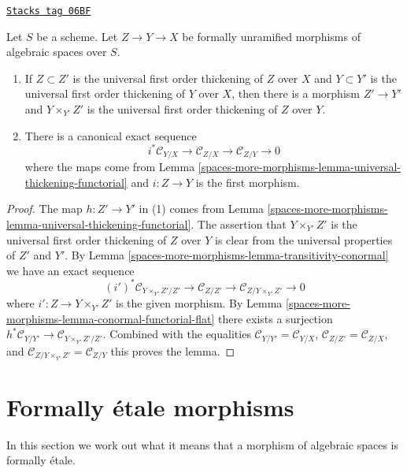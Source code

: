 \begin{lemma}
\label{spaces-more-morphisms-lemma-transitivity-conormal-unramified}
\href{https://stacks.math.columbia.edu/tag/06BF}{\texttt{Stacks tag 06BF}}

Let $S$ be a scheme.
Let $Z \to Y \to X$ be formally unramified morphisms of
algebraic spaces over $S$.
\begin{enumerate}
\item If $Z \subset Z'$ is the universal first order thickening of $Z$
over $X$ and $Y \subset Y'$ is the universal first order thickening of $Y$
over $X$, then there is a morphism $Z' \to Y'$ and $Y \times_{Y'} Z'$ is
the universal first order thickening of $Z$ over $Y$.
\item There is a canonical exact sequence
$$
i^*\mathcal{C}_{Y/X} \to
\mathcal{C}_{Z/X} \to
\mathcal{C}_{Z/Y} \to 0
$$
where the maps come from
Lemma \ref{spaces-more-morphisms-lemma-universal-thickening-functorial}
and $i : Z \to Y$ is the first morphism.
\end{enumerate}
\end{lemma}

\begin{proof}
The map $h : Z' \to Y'$ in (1) comes from
Lemma \ref{spaces-more-morphisms-lemma-universal-thickening-functorial}.
The assertion that $Y \times_{Y'} Z'$ is the universal first order
thickening of $Z$ over $Y$ is clear from the universal properties
of $Z'$ and $Y'$. By
Lemma \ref{spaces-more-morphisms-lemma-transitivity-conormal}
we have an exact sequence
$$
(i')^*\mathcal{C}_{Y \times_{Y'} Z'/Z'} \to
\mathcal{C}_{Z/Z'} \to
\mathcal{C}_{Z/Y \times_{Y'} Z'} \to 0
$$
where $i' : Z \to Y \times_{Y'} Z'$ is the given morphism. By
Lemma \ref{spaces-more-morphisms-lemma-conormal-functorial-flat}
there exists a surjection
$h^*\mathcal{C}_{Y/Y'} \to \mathcal{C}_{Y \times_{Y'} Z'/Z'}$.
Combined with the equalities
$\mathcal{C}_{Y/Y'} = \mathcal{C}_{Y/X}$,
$\mathcal{C}_{Z/Z'} = \mathcal{C}_{Z/X}$, and
$\mathcal{C}_{Z/Y \times_{Y'} Z'} = \mathcal{C}_{Z/Y}$
this proves the lemma.
\end{proof}

\section{Formally \'etale morphisms}
\label{spaces-more-morphisms-section-formally-etale}
In this section we work out what it means that a morphism of algebraic spaces
is formally \'etale.


